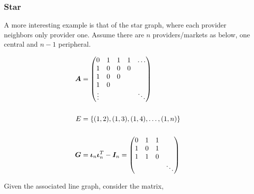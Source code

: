 \subsubsection{Star}

A more interesting example is that of the star graph, where each provider neighbors only provider one. Assume there are $n$ providers/markets as below, one central and $n-1$ peripheral.

\vspace{5mm}
\begin{minipage}{.5\textwidth}
    \resizebox{\textwidth}{!}{}
\end{minipage}
\begin{minipage}{.5\textwidth}
    \begin{equation*}
        \begin{split}
            \matr{A} &= \begin{pmatrix}
                0      & 1 & 1 & 1 & \ldots \\
                1      & 0 & 0 & 0 &        \\
                1      & 0 & 0 &   &        \\
                1      & 0 &   &   &        \\
                \vdots &   &   &   & \ddots
            \end{pmatrix} \\
            \vspace{5mm} \\
            E &= \set{(1, 2), (1, 3), (1, 4), \ldots, (1, n)} \\
            \vspace{5mm} \\
            \G &= \matr{\iota}_n \matr{\iota}_n^T - \I_n =  \begin{pmatrix}
                0 & 1 & 1 &        \\
                1 & 0 & 1 &        \\
                1 & 1 & 0 &        \\
                  &   &   & \ddots
            \end{pmatrix}
        \end{split}
    \end{equation*}
\end{minipage}
\vspace{5mm}

Given the associated line graph, consider the matrix,

